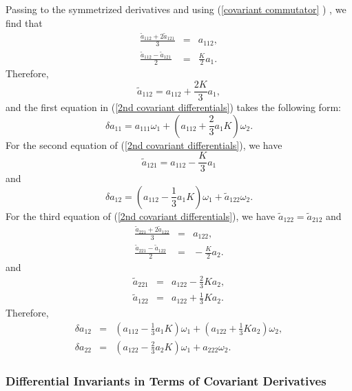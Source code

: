 \documentclass{article}
\begin{document}
Passing to the symmetrized derivatives and using (\ref{covariant commutator}%
) , we find that
\begin{eqnarray*}
\frac{\widetilde{a}_{112}+2\widetilde{a}_{121}}{3} &\!\!\!\!=&\!\!\!%
\!a_{112}, \\
\frac{\widetilde{a}_{112}-\widetilde{a}_{121}}{2} &\!\!\!\!=&\!\!\!\!\frac{K%
}{2}a_{1}.
\end{eqnarray*}%
Therefore,
\begin{equation*}
\widetilde{a}_{112}=a_{112}+\frac{2K}{3}a_{1},
\end{equation*}%
and the first equation in (\ref{2nd covariant differentials}) takes the
following form:
\begin{equation*}
\delta a_{11}=a_{111}\omega _{1}+(a_{112}+\frac{2}{3}a_{1}K)\omega _{2}.
\end{equation*}%
For the second equation of (\ref{2nd covariant differentials}), we have
\begin{equation*}
\widetilde{a}_{121}=a_{112}-\frac{K}{3}a_{1}
\end{equation*}%
and
\begin{equation*}
\delta a_{12}=(a_{112}-\frac{1}{3}a_{1}K)\omega _{1}+\widetilde{a}%
_{122}\omega _{2}.
\end{equation*}%
For the third equation of (\ref{2nd covariant differentials}), we have $%
\widetilde{a}_{122}=\widetilde{a}_{212}$ and
\begin{eqnarray*}
\frac{\widetilde{a}_{221}+2\widetilde{a}_{122}}{3} &\!\!\!\!=&\!\!\!%
\!a_{122}, \\
\frac{\widetilde{a}_{221}-\widetilde{a}_{122}}{2} &\!\!\!\!=&\!\!\!\!-\frac{K%
}{2}a_{2}.
\end{eqnarray*}%
and
\begin{eqnarray*}
\widetilde{a}_{221} &\!\!\!\!=&\!\!\!\!a_{122}-\frac{2}{3}Ka_{2}, \\
\widetilde{a}_{122} &\!\!\!\!=&\!\!\!\!a_{122}+\frac{1}{3}Ka_{2}.
\end{eqnarray*}%
Therefore,
\begin{eqnarray*}
\delta a_{12} &\!\!\!\!=&\!\!\!\!(a_{112}-\frac{1}{3}a_{1}K)\omega
_{1}+(a_{122}+\frac{1}{3}Ka_{2})\omega _{2}, \\
\delta a_{22} &\!\!\!\!=&\!\!\!\!(a_{122}-\frac{2}{3}a_{2}K)\omega
_{1}+a_{222}\omega _{2}.
\end{eqnarray*}

\subsubsection{Differential Invariants in Terms of Covariant Derivatives}
\end{document}
